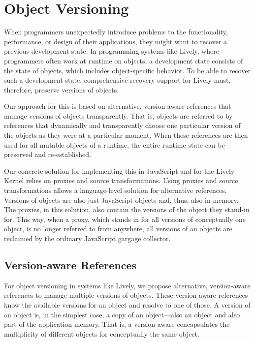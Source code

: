
\chapter{Object Versioning} \label{chapter:APPROACH}

When programmers unexpectedly introduce problems to the functionality, performance, or design of their applications, they might want to recover a previous development state.
In programming systems like Lively, where programmers often work at runtime on objects, a development state consists of the state of objects, which includes object-specific behavior.
To be able to recover such a development state, comprehensive recovery support for Lively must, therefore, preserve versions of objects.

Our approach for this is based on alternative, version-aware references that manage versions of objects transparently.
That is, objects are referred to by references that dynamically and transparently choose one particular version of the objects as they were at a particular moment.
When these references are then used for all mutable objects of a runtime, the entire runtime state can be preserved and re-established.

Our concrete solution for implementing this in JavaScript and for the Lively Kernel relies on proxies and source transformations.
Using proxies and source transformations allows a language-level solution for alternative references.
Versions of objects are also just JavaScript objects and, thus, also in memory.
The proxies, in this solution, also contain the versions of the object they stand-in for.
This way, when a proxy, which stands in for all versions of conceptually one object, is no longer referred to from anywhere, all versions of an objects are reclaimed by the ordinary JavaScript gargage collector.


\section{Version-aware References} \label{sec:APPROACH:1}

For object versioning in systems like Lively, we propose alternative, version-aware references to manage multiple versions of objects.
These version-aware references know the available versions for an object and resolve to one of those.
A version of an object is, in the simplest case, a copy of an object---also an object and also part of the application memory.
That is, a version-aware cencapsulates the multiplicity of different objects for conceptually the same object.

